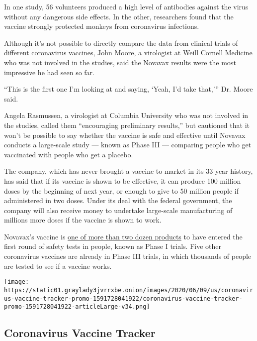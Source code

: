 In one study, 56 volunteers produced a high level of antibodies against
the virus without any dangerous side effects. In the other, researchers
found that the vaccine strongly protected monkeys from coronavirus
infections.

Although it's not possible to directly compare the data from clinical
trials of different coronavirus vaccines, John Moore, a virologist at
Weill Cornell Medicine who was not involved in the studies, said the
Novavax results were the most impressive he had seen so far.

``This is the first one I'm looking at and saying, `Yeah, I'd take
that,''' Dr. Moore said.

Angela Rasmussen, a virologist at Columbia University who was not
involved in the studies, called them ``encouraging preliminary
results,'' but cautioned that it won't be possible to say whether the
vaccine is safe and effective until Novavax conducts a large-scale study
--- known as Phase III --- comparing people who get vaccinated with
people who get a placebo.

The company, which has never brought a vaccine to market in its 33-year
history, has said that if its vaccine is shown to be effective, it can
produce 100 million doses by the beginning of next year, or enough to
give to 50 million people if administered in two doses. Under its deal
with the federal government, the company will also receive money to
undertake large-scale manufacturing of millions more doses if the
vaccine is shown to work.

Novavax's vaccine is
\href{https://www.nytimes3xbfgragh.onion/interactive/2020/science/coronavirus-vaccine-tracker.html}{one
of more than two dozen products} to have entered the first round of
safety tests in people, known as Phase I trials. Five other coronavirus
vaccines are already in Phase III trials, in which thousands of people
are tested to see if a vaccine works.

\href{https://www.nytimes3xbfgragh.onion/interactive/2020/science/coronavirus-vaccine-tracker.html}{}

\texttt{[image: https://static01.graylady3jvrrxbe.onion/images/2020/06/09/us/coronavirus-vaccine-tracker-promo-1591728041922/coronavirus-vaccine-tracker-promo-1591728041922-articleLarge-v34.png]}

\hypertarget{coronavirus-vaccine-tracker}{%
\subsection{Coronavirus Vaccine
Tracker}\label{coronavirus-vaccine-tracker}}

